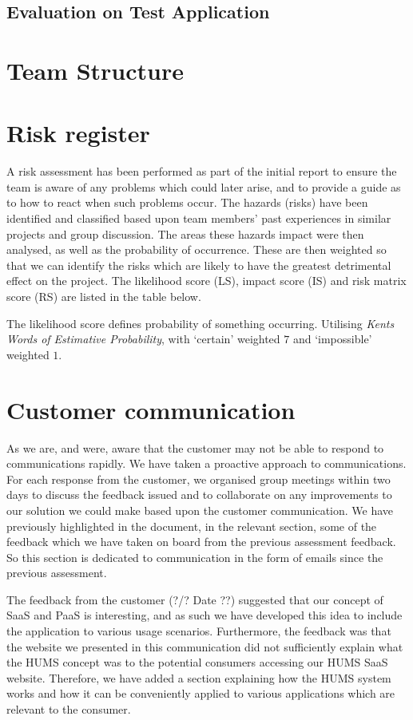 \documentclass[10pt,a4paper]{article}
\begin{document}
\subsection{Evaluation on Test Application}

\section{Team Structure}

\section{Risk register}
A risk assessment has been performed as part of the initial report to ensure the team is aware of any problems which could later arise, and to provide a guide as to how to react when such problems occur. The hazards (risks) have been identified and classified based upon team members' past experiences in similar projects and group discussion. The areas these hazards impact were then analysed, as well as the probability of occurrence. These are then weighted so that we can identify the risks which are likely to have the greatest detrimental effect on the project. The likelihood score (LS), impact score (IS) and risk matrix score (RS) are listed in the table below.



The likelihood score defines probability of something occurring. Utilising
\textit{Kents Words of Estimative Probability}\cite{kent1966strategic}, with
`certain' weighted $7$ and `impossible' weighted $1$.




\section{Customer communication}
As we are, and were, aware that the customer may not be able to respond to communications rapidly. We have taken a proactive approach to communications. For each response from the customer, we organised group meetings within two days to discuss the feedback issued and to collaborate on any improvements to our solution we could make based upon the customer communication. We have previously highlighted in the document, in the relevant section, some of the feedback which we have taken on board from the previous assessment feedback. So this section is dedicated to communication in the form of emails since the previous assessment.

The feedback from the customer (?/? Date ??) suggested that our concept of SaaS and PaaS is interesting, and as such we have developed this idea to include the application to various usage scenarios. Furthermore, the feedback was that the website we presented in this communication did not sufficiently explain what the HUMS concept was to the potential consumers accessing our HUMS SaaS website. Therefore, we have added a section explaining how the HUMS system works and how it can be conveniently applied to various applications which are relevant to the consumer.

\vfill


\end{document}
